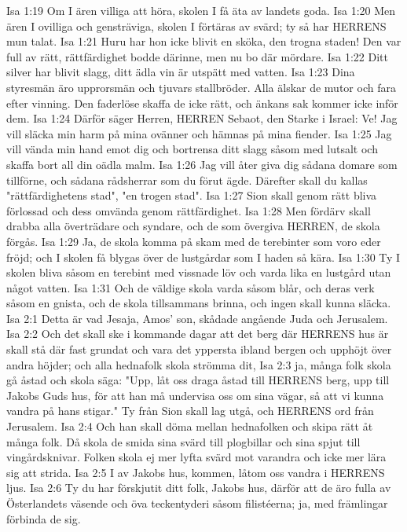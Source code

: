 Isa 1:19  Om I ären villiga att höra, skolen I få äta av landets goda.
Isa 1:20  Men ären I ovilliga och gensträviga, skolen I förtäras av svärd; ty så har HERRENS mun talat.
Isa 1:21  Huru har hon icke blivit en sköka, den trogna staden! Den var full av rätt, rättfärdighet bodde därinne, men nu bo där mördare.
Isa 1:22  Ditt silver har blivit slagg, ditt ädla vin är utspätt med vatten.
Isa 1:23  Dina styresmän äro upprorsmän och tjuvars stallbröder. Alla älskar de mutor och fara efter vinning. Den faderlöse skaffa de icke rätt, och änkans sak kommer icke inför dem.
Isa 1:24  Därför säger Herren, HERREN Sebaot, den Starke i Israel: Ve! Jag vill släcka min harm på mina ovänner och hämnas på mina fiender.
Isa 1:25  Jag vill vända min hand emot dig och bortrensa ditt slagg såsom med lutsalt och skaffa bort all din oädla malm.
Isa 1:26  Jag vill åter giva dig sådana domare som tillförne, och sådana rådsherrar som du förut ägde. Därefter skall du kallas "rättfärdighetens stad", "en trogen stad".
Isa 1:27  Sion skall genom rätt bliva förlossad och dess omvända genom rättfärdighet.
Isa 1:28  Men fördärv skall drabba alla överträdare och syndare, och de som övergiva HERREN, de skola förgås.
Isa 1:29  Ja, de skola komma på skam med de terebinter som voro eder fröjd; och I skolen få blygas över de lustgårdar som I haden så kära.
Isa 1:30  Ty I skolen bliva såsom en terebint med vissnade löv och varda lika en lustgård utan något vatten.
Isa 1:31  Och de väldige skola varda såsom blår, och deras verk såsom en gnista, och de skola tillsammans brinna, och ingen skall kunna släcka.
Isa 2:1  Detta är vad Jesaja, Amos' son, skådade angående Juda och Jerusalem.
Isa 2:2  Och det skall ske i kommande dagar att det berg där HERRENS hus är skall stå där fast grundat och vara det yppersta ibland bergen och upphöjt över andra höjder; och alla hednafolk skola strömma dit,
Isa 2:3  ja, många folk skola gå åstad och skola säga: "Upp, låt oss draga åstad till HERRENS berg, upp till Jakobs Guds hus, för att han må undervisa oss om sina vägar, så att vi kunna vandra på hans stigar." Ty från Sion skall lag utgå, och HERRENS ord från Jerusalem.
Isa 2:4  Och han skall döma mellan hednafolken och skipa rätt åt många folk. Då skola de smida sina svärd till plogbillar och sina spjut till vingårdsknivar. Folken skola ej mer lyfta svärd mot varandra och icke mer lära sig att strida.
Isa 2:5  I av Jakobs hus, kommen, låtom oss vandra i HERRENS ljus.
Isa 2:6  Ty du har förskjutit ditt folk, Jakobs hus, därför att de äro fulla av Österlandets väsende och öva teckentyderi såsom filistéerna; ja, med främlingar förbinda de sig.
